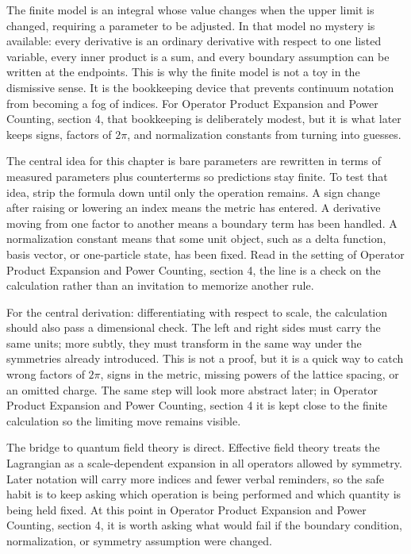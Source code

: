 The finite model is an integral whose value changes when the upper limit is changed, requiring a parameter to be adjusted.  In that model no mystery is available: every derivative is an ordinary derivative with respect to one listed variable, every inner product is a sum, and every boundary assumption can be written at the endpoints.  This is why the finite model is not a toy in the dismissive sense.  It is the bookkeeping device that prevents continuum notation from becoming a fog of indices.  For Operator Product Expansion and Power Counting, section 4, that bookkeeping is deliberately modest, but it is what later keeps signs, factors of \(2\pi\), and normalization constants from turning into guesses.

The central idea for this chapter is bare parameters are rewritten in terms of measured parameters plus counterterms so predictions stay finite.  To test that idea, strip the formula down until only the operation remains.  A sign change after raising or lowering an index means the metric has entered.  A derivative moving from one factor to another means a boundary term has been handled.  A normalization constant means that some unit object, such as a delta function, basis vector, or one-particle state, has been fixed.  Read in the setting of Operator Product Expansion and Power Counting, section 4, the line is a check on the calculation rather than an invitation to memorize another rule.

For the central derivation: differentiating with respect to scale, the calculation should also pass a dimensional check.  The left and right sides must carry the same units; more subtly, they must transform in the same way under the symmetries already introduced.  This is not a proof, but it is a quick way to catch wrong factors of \(2\pi\), signs in the metric, missing powers of the lattice spacing, or an omitted charge.  The same step will look more abstract later; in Operator Product Expansion and Power Counting, section 4 it is kept close to the finite calculation so the limiting move remains visible.

The bridge to quantum field theory is direct.  Effective field theory treats the Lagrangian as a scale-dependent expansion in all operators allowed by symmetry.  Later notation will carry more indices and fewer verbal reminders, so the safe habit is to keep asking which operation is being performed and which quantity is being held fixed.  At this point in Operator Product Expansion and Power Counting, section 4, it is worth asking what would fail if the boundary condition, normalization, or symmetry assumption were changed.

